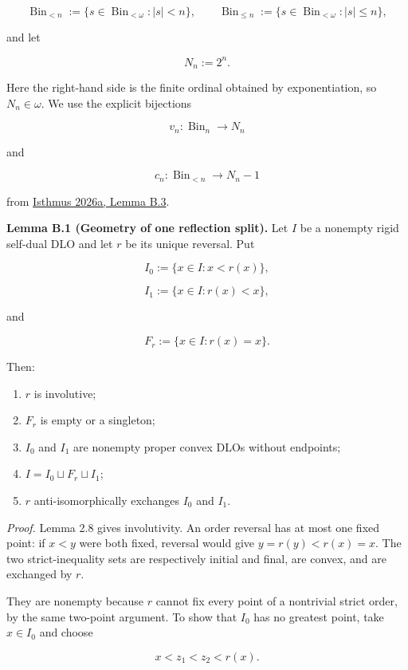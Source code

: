 \documentclass[
  english,
  11pt,
  reqno]{amsart}
\newcounter{none} %
\providecommand{\tightlist}{%
  \setlength{\itemsep}{0pt}\setlength{\parskip}{0pt}}
\begin{document}
\[
\operatorname{Bin}_{<n}
:=
\{s\in\operatorname{Bin}_{<\omega}:|s|<n\},
\qquad
\operatorname{Bin}_{\le n}
:=
\{s\in\operatorname{Bin}_{<\omega}:|s|\le n\},
\]

and let

\[
N_n:=2^n.
\]

Here the right-hand side is the finite ordinal obtained by
exponentiation, so \(N_n\in\omega\). We use the explicit bijections

\[
v_n:\operatorname{Bin}_n\longrightarrow N_n
\]

and

\[
c_n:\operatorname{Bin}_{<n}\longrightarrow N_n-1
\]

from \hyperref[ref:isthmus2026a]{Isthmus 2026a, Lemma B.3}.

\protect{}\label{lem:b-1-reflection-split}

\textbf{Lemma B.1 (Geometry of one reflection split).} Let \(I\) be a
nonempty rigid self-dual DLO and let \(r\) be its unique reversal. Put

\[
I_0:=\{x\in I:x<r(x)\},
\]

\[
I_1:=\{x\in I:r(x)<x\},
\]

and

\[
F_r:=\{x\in I:r(x)=x\}.
\]

Then:

\begin{enumerate}
\tightlist
\item
  \(r\) is involutive;
\item
  \(F_r\) is empty or a singleton;
\item
  \(I_0\) and \(I_1\) are nonempty proper convex DLOs without endpoints;
\item
  \(I=I_0\sqcup F_r\sqcup I_1\);
\item
  \(r\) anti-isomorphically exchanges \(I_0\) and \(I_1\).
\end{enumerate}

\emph{Proof.} Lemma 2.8 gives involutivity. An order reversal has at
most one fixed point: if \(x<y\) were both fixed, reversal would give
\(y=r(y)<r(x)=x\). The two strict-inequality sets are respectively
initial and final, are convex, and are exchanged by \(r\).

They are nonempty because \(r\) cannot fix every point of a nontrivial
strict order, by the same two-point argument. To show that \(I_0\) has
no greatest point, take \(x\in I_0\) and choose

\[
x<z_1<z_2<r(x).
\]
\end{document}
